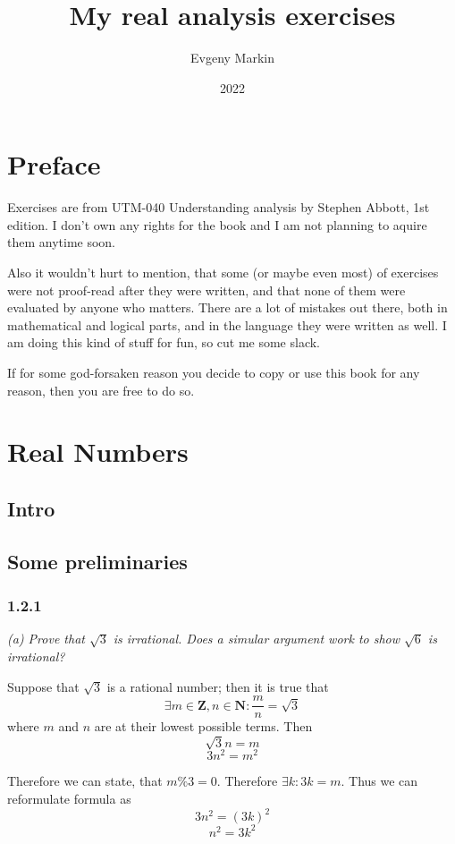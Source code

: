\documentclass[11pt,oneside,titlepage]{book}
\title{My real analysis exercises}
\author{Evgeny Markin}
\date{2022}
\begin{document}
\maketitle
\tableofcontents

\chapter*{Preface}

Exercises are from UTM-040 Understanding analysis by Stephen Abbott, 1st
edition. I don't own any rights
for the book and I am not planning to aquire them anytime soon. 

Also it wouldn't hurt to mention, that some (or maybe even most) of exercises
were not proof-read after they were written,  and that none of them were
evaluated by anyone who matters. There are a lot of mistakes out  there, both
in mathematical and logical parts, and in the language they were written as
well. I am doing this kind of stuff for fun, so cut me some slack.

If for some god-forsaken reason you decide to copy or use this book for
any reason, then you are free to do so.

\chapter{Real Numbers}

\section{Intro}

\section{Some preliminaries}
\subsection*{1.2.1}
\textit{(a) Prove that $\sqrt{3}$ is irrational. Does a simular argument work
  to show $\sqrt{6}$ is irrational?}

Suppose that $\sqrt{3}$ is a rational number; then it is true that
$$\exists m \in \textbf{Z}, n \in \textbf{N}: \frac{m}{n} = \sqrt{3}$$
where $m$ and $n$ are at their lowest possible terms. Then
$$\sqrt{3}n = m$$
$$3n^2 = m^2$$

Therefore we can state, that $m \% 3 = 0$. Therefore $\exists k: 3k = m$.
Thus we can reformulate formula as
$$3n^2 = (3k)^2$$
$$n^2 = 3k^2$$
\end{document}
